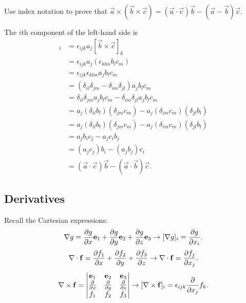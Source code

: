 \documentclass[10pt, a4paper]{article}
\begin{document}
\begin{example}
    Use index notation to prove that $\vec{a} \times (\vec{b} \times \vec{c}) = (\vec{a} \cdot \vec{c})\vec{b} - (\vec{a} - \vec{b})\vec{c}$.

    \begin{solution}
        The $i$th component of the left-hand side is
        \begin{align*}
            [\vec{a} \times (\vec{b} \times \vec{c})]_i &= \epsilon_{ijk}a_j[\vec{b} \times \vec{c}]_k \\
            &= \epsilon_{ijk}a_j(\epsilon_{klm}b_lc_m) \\
            &= \epsilon_{ijk}\epsilon_{klm}a_jb_lc_m \\
            &= (\delta_{il}\delta_{jm} - \delta_{im}\delta_{jl})a_jb_lc_m \\
            &= \delta_{il}\delta_{jm}a_jb_lc_m - \delta_{im}\delta_{jl}a_jb_lc_m \\
            &= a_j(\delta_{il}b_l)(\delta_{jm}c_m) - a_j(\delta_{im}c_m)(\delta_{jl}b_l) \\
            &= a_j(\delta_{il}b_l)(\delta_{jm}c_m) - a_j(\delta_{im}c_m)(\delta_{jl}b_l) \\
            &= a_jb_ic_j - a_jc_ib_j \\
            &= (a_jc_j)b_i - (a_jb_j)c_i \\
            &= (\vec{a} \cdot \vec{c})\vec{b} - (\vec{a} \cdot \vec{b})\vec{c}.
        \end{align*}
    \end{solution}
\end{example}

\subsection{Derivatives}

Recall the Cartesian expressions:
\[
\bnabla g = \pd[g]{x}\vec{e}_1 + \pd[g]{y}\vec{e}_2 + \pd[g]{z}\vec{e}_3 \to [\bnabla g]_{i} = \pd[g]{x_i}.
\]
\[
\bnabla \cdot \vec{f} = \pd[f_1]{x} + \pd[f_2]{y} + \pd[f_3]{z} \to \bnabla \cdot \vec{f} = \pd[f_j]{x_j}.
\]
\[
\bnabla \times \vec{f} = \begin{vmatrix}
    \vec{e}_1 & \vec{e}_2 & \vec{e}_3 \\
    \pd{x} & \pd{y} & \pd{z} \\
    f_1 & f_2 & f_3
\end{vmatrix} \to [\bnabla \times \vec{f}]_{i} = \epsilon_{ijk}\pd{x_j}f_k.
\]
\end{document}
